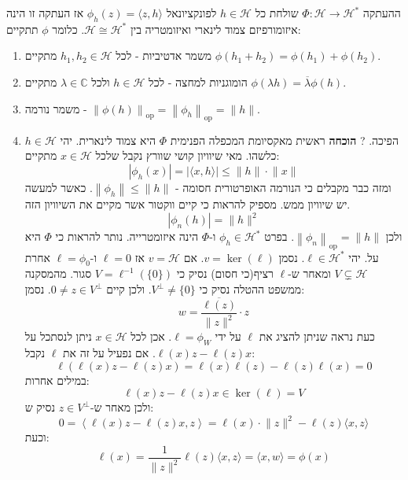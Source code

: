 \documentclass{tstextbook}
\begin{document}
\begin{theorem}
ההעתקה \(\Phi:\mathcal{H}\to \mathcal{H}^{*}\) שולחת כל \(h \in \mathcal{H}\) לפונקציונאל \(\phi_{h}(z)=\langle z,h \rangle\) אז העתקה זו הינה איזומורפיזם צמוד לינארי ואיזומטריה בין \(\mathcal{H} \cong \mathcal{H}^{*}\). כלומר \(\phi\) תתקיים:

  \begin{enumerate}
    \item משמר אדטיביות - לכל \(h_{1},h_{2} \in \mathcal{H}\) מתקיים \(\phi(h_{1}+h_{2})=\phi(h_{1})+\phi(h_{2})\). 


    \item הומוגניות למחצה - לכל \(h \in \mathcal{H}\) ולכל \(\lambda \in \mathbb{C}\) מתקיים \(\phi\left( \lambda h \right)=\overline{\lambda}\phi(h)\). 


    \item משמר נורמה - \(\left\lVert  \phi(h)  \right\rVert_{\mathrm{op}}=\left\lVert  \phi_{h}  \right\rVert_{\mathrm{op}}=\lVert h \rVert\). 


    \item הפיכה. 
?
\textbf{הוכחה}
ראשית מאקסיומת המכפלה הפנימית \(\Phi\) היא צמוד לינארית. יהי \(h \in \mathcal{H}\) כלשהו. מאי שיוויון קושי שוורץ נקבל שלכל \(x \in \mathcal{H}\) מתקיים:
$$\left\lvert  \phi_{h}(x)  \right\rvert =\left\lvert  \langle x,h \rangle   \right\rvert \leq \lVert h \rVert \cdot \lVert x \rVert $$
ומזה כבר מקבלים כי הנורמה האופרטורית חסומה - \(\left\lVert  \phi_{h}  \right\rVert\leq \lVert h \rVert\). כאשר למעשה יש שיוויון ממש. מספיק להראות כי קיים ווקטור אשר מקיים את השיוויון הזה. 
$$\left\lvert  \phi_{n}(h)  \right\rvert =\lVert h \rVert ^{2}$$
ולכן \(\left\lVert  \phi_{n}  \right\rVert_{\mathrm{op}}=\lVert h \rVert\). בפרט \(\phi_{h}\in \mathcal{H}^{*}\) ו-\(\Phi\) הינה איזומטרייה. נותר להראות כי \(\Phi\) היא על. 
יהי \(\ell \in \mathcal{H}^{*}\). נסמן \(v=\ker\left( \ell \right)\). אם \(v = \mathcal{H}\) אז \(\ell=0\) ו-\(\ell=\phi_{0}\) אחרת \(V\subsetneq \mathcal{H}\) ומאחר ש-\(\ell\) רציף(כי חסום) נסיק כי \(V= \ell^{-1}\left( \{ 0 \} \right)\) סגור.
מהמסקנה ממשפט ההטלה נסיק כי \(V^{\perp}\neq \{ 0 \}\). ולכן קיים \(0\neq z \in V^{\perp}\). נסמן:
$$w=\frac{\overline{\ell(z)}}{\lVert z \rVert ^{2}}\cdot z $$
כעת נראה שניתן להציג את \(\ell\) על ידי \(\ell=\phi_{W}\). אכן לכל \(x \in \mathcal{H}\) ניתן לנסתכל על \(\ell(x)z-\ell(z)x\). אם נפעיל על זה את \(\ell\) נקבל:
$$\ell\left( \ell(x)z-\ell(z)x \right)=\ell(x)\ell(z)-\ell(z)\ell(x)=0$$
במילים אחרות:
$$\ell(x)z-\ell(z)x \in \ker \left( \ell \right)=V$$
ולכן מאחר ש-\(z \in V^{\perp}\) נסיק ש:
$$0=\left\langle  \ell(x)z-\ell(z)x,z  \right\rangle =\ell(x)\cdot \lVert z \rVert ^{2}-\ell(z)\langle x,z \rangle $$
וכעת:
$$\ell(x)= \frac{1}{\lVert z \rVert ^{2}}\ell(z)\langle x,z \rangle =\langle x,w \rangle =\phi(x)$$


  \end{enumerate}
\end{theorem}
\end{document}

